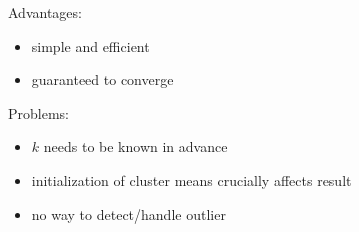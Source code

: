 Advantages:
\begin{itemize}
\item simple and efficient
\item guaranteed to converge
\end{itemize}
Problems:
\begin{itemize}
\item \(k\) needs to be known in advance
\item initialization of cluster means crucially affects result
\item no way to detect/handle outlier
\end{itemize}